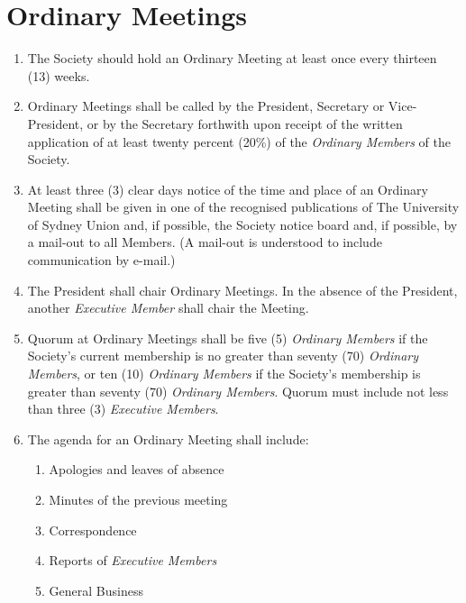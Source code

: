 \documentclass[11pt]{article}
\begin{document}
\section{Ordinary Meetings}
\begin{enumerate}[\thesection .1]
    \item The Society should hold an Ordinary Meeting at least once every thirteen (13) weeks.
    \item Ordinary Meetings shall be called by the President, Secretary or Vice-President, or by the Secretary forthwith upon receipt of the written application of at least twenty percent (20\%) of the \textit{Ordinary Members} of the Society.
    \item At least three (3) clear days notice of the time and place of an Ordinary Meeting shall be given in one of the recognised publications of The University of Sydney Union and, if possible, the Society notice board and, if possible, by a mail-out to all Members. (A mail-out is understood to include communication by e-mail.)
    \item The President shall chair Ordinary Meetings. In the absence of the President, another \textit{Executive Member} shall chair the Meeting.
    \item Quorum at Ordinary Meetings shall be five (5) \textit{Ordinary Members} if the Society’s current membership is no greater than seventy (70) \textit{Ordinary Members}, or ten (10) \textit{Ordinary Members} if the Society’s membership is greater than seventy (70) \textit{Ordinary Members}. Quorum must include not less than three (3) \textit{Executive Members}.
    \item The agenda for an Ordinary Meeting shall include:
    \begin{enumerate}[\hspace{5mm}1.]
        \item Apologies and leaves of absence
        \item Minutes of the previous meeting
        \item Correspondence
        \item Reports of \textit{Executive Members}
        \item General Business
    \end{enumerate}
    

\end{enumerate}
\end{document}
